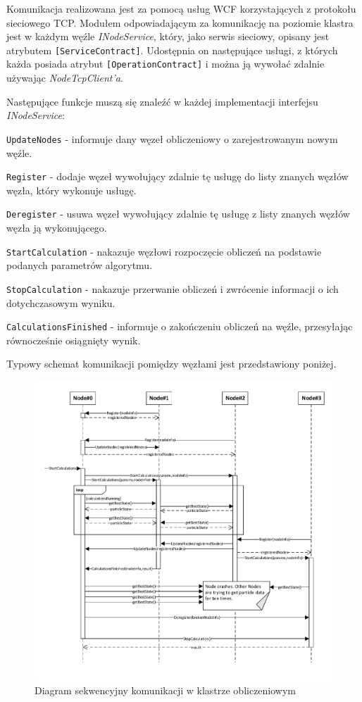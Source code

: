 \documentclass[12pt, twoside, openany, abstract=on]{report}
\theoremstyle{definition}
\begin{document}
Komunikacja realizowana jest za pomocą usług WCF korzystających z protokołu sieciowego TCP. Modułem odpowiadającym za komunikację na poziomie klastra jest w każdym węźle \textit{INodeService}, który, jako serwis sieciowy, opisany jest atrybutem \texttt{[ServiceContract]}. Udostępnia on następujące usługi, z których każda posiada atrybut \texttt{[OperationContract]} i można ją wywołać zdalnie używając \textit{NodeTcpClient'a}.

Następujące funkcje muszą się znaleźć w każdej implementacji interfejsu \textit{INodeService}:

\texttt{UpdateNodes} - informuje dany węzeł obliczeniowy o zarejestrowanym nowym węźle.

\texttt{Register} - dodaje węzeł wywołujący zdalnie tę usługę do listy znanych węzłów węzła, który wykonuje usługę.

\texttt{Deregister} - usuwa węzeł wywołujący zdalnie tę usługę z listy znanych węzłów węzła ją wykonującego.

\texttt{StartCalculation} - nakazuje węzłowi rozpoczęcie obliczeń na podstawie podanych parametrów algorytmu.

\texttt{StopCalculation} - nakazuje przerwanie obliczeń i zwrócenie informacji o ich dotychczasowym wyniku.

\texttt{CalculationsFinished} - informuje o zakończeniu obliczeń na węźle, przesyłając równocześnie osiągnięty wynik.

Typowy schemat komunikacji pomiędzy węzłami jest przedstawiony poniżej.

\begin{figure}[H]
    \centering
    \includegraphics[scale=0.8]{communicationDiagram.pdf} 
 \caption{Diagram sekwencyjny komunikacji w klastrze obliczeniowym}
\end{figure}
\end{document}
